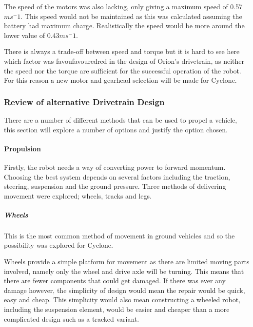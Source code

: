 The speed of the motors was also lacking, only giving a maximum speed of 0.57$ms^-1$. This speed would not be maintained as this was calculated assuming the battery had maximum charge. Realistically the speed would be more around the lower value of 0.43$ms^-1$.\par

There is always a trade-off between speed and torque but it is hard to see here which factor was favoufavouredred  in the design of Orion’s drivetrain, as neither the speed nor the torque are sufficient for the successful operation of the robot. For this reason a new motor and gearhead selection will be made for Cyclone.\par

\subsubsection{Review of alternative Drivetrain Design}

There are a number of different methods that can be used to propel a vehicle, this section will explore a number of options and justify the option chosen.\par

\paragraph*{Propulsion}

Firstly, the robot needs a way of converting power to forward momentum. Choosing the best system depends on several factors including the traction, steering, suspension and the ground pressure. Three methods of delivering movement were explored; wheels, tracks and legs.\par

\subparagraph*{Wheels}
This is the most common method of movement in ground vehicles and so the possibility was explored for Cyclone.\par

Wheels provide a simple platform for movement as there are limited moving parts involved, namely only the wheel and drive axle will be turning. This means that there are fewer components that could get damaged. If there was ever any damage however, the simplicity of design would mean the repair would be quick, easy and cheap. This simplicity would also mean constructing a wheeled robot, including the suspension element, would be easier and cheaper than a more complicated design such as a tracked variant.\par

